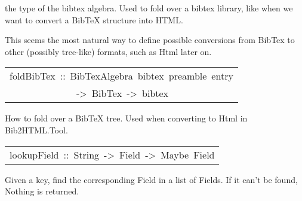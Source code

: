 \begin{haddockdesc}
\item[\begin{tabular}{@{}l}
type\ BibTexAlgebra\ bibtex\ preamble\ entry\ =\ ({\char 91}preamble{\char 93}\\\ \ \ \ \ \ \ \ \ \ \ \ \ \ \ \ \ \ \ \ \ \ \ \ \ \ \ \ \ \ \ \ \ \ \ \ \ \ \ \ \ \ \ \ ->\ {\char 91}entry{\char 93}\ ->\ bibtex,\ String\ ->\ preamble,\ EntryType\\\ \ \ \ \ \ \ \ \ \ \ \ \ \ \ \ \ \ \ \ \ \ \ \ \ \ \ \ \ \ \ \ \ \ \ \ \ \ \ \ \ \ \ \ \ \ \ \ \ \ \ \ \ \ \ \ \ \ \ \ \ \ \ \ \ \ \ \ \ \ \ \ \ \ \ \ \ \ \ \ \ \ \ \ \ \ ->\ Reference\\\ \ \ \ \ \ \ \ \ \ \ \ \ \ \ \ \ \ \ \ \ \ \ \ \ \ \ \ \ \ \ \ \ \ \ \ \ \ \ \ \ \ \ \ \ \ \ \ \ \ \ \ \ \ \ \ \ \ \ \ \ \ \ \ \ \ \ \ \ \ \ \ \ \ \ \ \ \ \ \ \ \ \ \ \ \ \ \ \ ->\ {\char 91}Field{\char 93}\\\ \ \ \ \ \ \ \ \ \ \ \ \ \ \ \ \ \ \ \ \ \ \ \ \ \ \ \ \ \ \ \ \ \ \ \ \ \ \ \ \ \ \ \ \ \ \ \ \ \ \ \ \ \ \ \ \ \ \ \ \ \ \ \ \ \ \ \ \ \ \ \ \ \ \ \ \ \ \ \ \ \ \ \ \ \ \ \ \ \ \ \ ->\ entry)
\end{tabular}]\haddockbegindoc
the type of the bibtex algebra. Used to fold over a bibtex library,
 like when we want to convert a BibTeX structure into HTML. 
\par
This seems the most natural way to define possible conversions from BibTex to 
 other (possibly tree-like) formats, such as Html later on. 
\par

\end{haddockdesc}
\begin{haddockdesc}
\item[\begin{tabular}{@{}l}
foldBibTex\ ::\ BibTexAlgebra\ bibtex\ preamble\ entry\\\ \ \ \ \ \ \ \ \ \ \ \ \ \ ->\ BibTex\ ->\ bibtex
\end{tabular}]\haddockbegindoc
How to fold over a BibTeX tree. Used when converting to Html in Bib2HTML.Tool.
\par

\end{haddockdesc}
\begin{haddockdesc}
\item[\begin{tabular}{@{}l}
lookupField\ ::\ String\ ->\ {\char 91}Field{\char 93}\ ->\ Maybe\ Field
\end{tabular}]\haddockbegindoc
Given a key, find the corresponding Field in a list of Fields. If it can't be found, Nothing is returned. 
\par

\end{haddockdesc}
